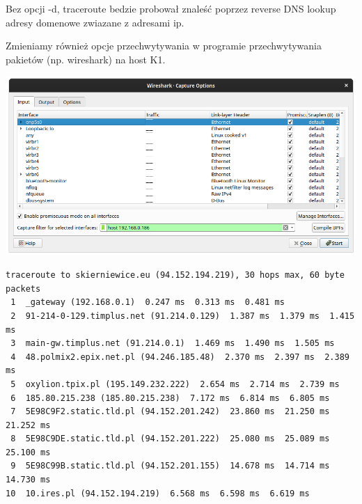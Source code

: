 \documentclass[11pt]{article}
\begin{document}
Bez opcji -d, traceroute bedzie probował znaleść poprzez reverse DNS lookup adresy domenowe zwiazane z adresami ip.

Zmieniamy również opcje przechwytywania w programie przechwytywania pakietów (np. wireshark) na host K1.
\begin{center}
\includegraphics[width=.9\linewidth]{./part2/options.png}
\end{center}
\begin{verbatim}
traceroute to skierniewice.eu (94.152.194.219), 30 hops max, 60 byte packets
 1  _gateway (192.168.0.1)  0.247 ms  0.313 ms  0.481 ms
 2  91-214-0-129.timplus.net (91.214.0.129)  1.387 ms  1.379 ms  1.415 ms
 3  main-gw.timplus.net (91.214.0.1)  1.469 ms  1.490 ms  1.505 ms
 4  48.polmix2.epix.net.pl (94.246.185.48)  2.370 ms  2.397 ms  2.389 ms
 5  oxylion.tpix.pl (195.149.232.222)  2.654 ms  2.714 ms  2.739 ms
 6  185.80.215.238 (185.80.215.238)  7.172 ms  6.814 ms  6.805 ms
 7  5E98C9F2.static.tld.pl (94.152.201.242)  23.860 ms  21.250 ms  21.252 ms
 8  5E98C9DE.static.tld.pl (94.152.201.222)  25.080 ms  25.089 ms  25.100 ms
 9  5E98C99B.static.tld.pl (94.152.201.155)  14.678 ms  14.714 ms  14.730 ms
10  10.ires.pl (94.152.194.219)  6.568 ms  6.598 ms  6.619 ms
\end{verbatim}
\end{document}
